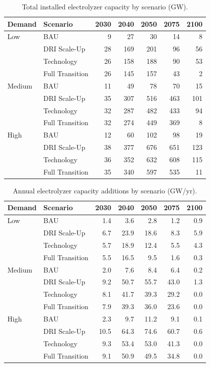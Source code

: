 \begin{table}[h!]
\centering
\small
\caption{Total installed electrolyzer capacity by scenario (GW).}
\label{tab:app_elec_stock}
\begin{tabular}{llrrrrr}
\toprule
Demand & Scenario & 2030 & 2040 & 2050 & 2075 & 2100 \\
\midrule
Low & BAU & 9 & 27 & 30 & 14 & 8 \\
 & DRI Scale-Up & 28 & 169 & 201 & 96 & 56 \\
 & Technology & 26 & 158 & 188 & 90 & 53 \\
 & Full Transition & 26 & 145 & 157 & 43 & 2 \\
\midrule
Medium & BAU & 11 & 49 & 78 & 70 & 15 \\
 & DRI Scale-Up & 35 & 307 & 516 & 463 & 101 \\
 & Technology & 32 & 287 & 482 & 433 & 94 \\
 & Full Transition & 32 & 274 & 449 & 369 & 8 \\
\midrule
High & BAU & 12 & 60 & 102 & 98 & 19 \\
 & DRI Scale-Up & 38 & 377 & 676 & 651 & 123 \\
 & Technology & 36 & 352 & 632 & 608 & 115 \\
 & Full Transition & 35 & 340 & 597 & 535 & 11 \\
\bottomrule
\end{tabular}
\end{table}


\begin{table}[h!]
\centering
\small
\caption{Annual electrolyzer capacity additions by scenario (GW/yr).}
\label{tab:app_elec_additions}
\begin{tabular}{llrrrrr}
\toprule
Demand & Scenario & 2030 & 2040 & 2050 & 2075 & 2100 \\
\midrule
Low & BAU & 1.4 & 3.6 & 2.8 & 1.2 & 0.9 \\
 & DRI Scale-Up & 6.7 & 23.9 & 18.6 & 8.3 & 5.9 \\
 & Technology & 5.7 & 18.9 & 12.4 & 5.5 & 4.3 \\
 & Full Transition & 5.5 & 16.5 & 9.5 & 1.6 & 0.3 \\
\midrule
Medium & BAU & 2.0 & 7.6 & 8.4 & 6.4 & 0.2 \\
 & DRI Scale-Up & 9.2 & 50.7 & 55.7 & 43.0 & 1.3 \\
 & Technology & 8.1 & 41.7 & 39.3 & 29.2 & 0.0 \\
 & Full Transition & 7.9 & 39.3 & 36.0 & 23.6 & 0.0 \\
\midrule
High & BAU & 2.3 & 9.7 & 11.2 & 9.1 & 0.1 \\
 & DRI Scale-Up & 10.5 & 64.3 & 74.6 & 60.7 & 0.6 \\
 & Technology & 9.3 & 53.4 & 53.0 & 41.3 & 0.0 \\
 & Full Transition & 9.1 & 50.9 & 49.5 & 34.8 & 0.0 \\
\bottomrule
\end{tabular}
\end{table}


